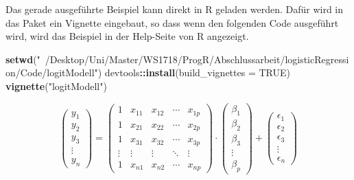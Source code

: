 \documentclass[12pt,]{article}
\newenvironment{Shaded}{\begin{snugshade}}{\end{snugshade}}
\newcommand{\KeywordTok}[1]{\textcolor[rgb]{0.13,0.29,0.53}{\textbf{#1}}}
\newcommand{\DataTypeTok}[1]{\textcolor[rgb]{0.13,0.29,0.53}{#1}}
\newcommand{\StringTok}[1]{\textcolor[rgb]{0.31,0.60,0.02}{#1}}
\newcommand{\OtherTok}[1]{\textcolor[rgb]{0.56,0.35,0.01}{#1}}
\newcommand{\OperatorTok}[1]{\textcolor[rgb]{0.81,0.36,0.00}{\textbf{#1}}}
\newcommand{\NormalTok}[1]{#1}
\begin{document}
Das gerade ausgeführte Beispiel kann direkt in R geladen werden. Dafür
wird in das Paket ein Vignette eingebaut, so dass wenn den folgenden
Code ausgeführt wird, wird das Beispiel in der Help-Seite von R
angezeigt.

\begin{Shaded}
\begin{Highlighting}[]
\KeywordTok{setwd}\NormalTok{(}\StringTok{"~/Desktop/Uni/Master/WS1718/ProgR/Abschlussarbeit/logisticRegression/Code/logitModell"}\NormalTok{)}
\NormalTok{devtools}\OperatorTok{::}\KeywordTok{install}\NormalTok{(}\DataTypeTok{build_vignettes =} \OtherTok{TRUE}\NormalTok{)}
\KeywordTok{vignette}\NormalTok{(}\StringTok{"logitModell"}\NormalTok{)}
\end{Highlighting}
\end{Shaded}

\[
\begin{pmatrix}
    y_1 \\ y_2 \\ y_3 \\ \vdots \\ y_n 
 \end{pmatrix} = 
 \begin{pmatrix}
    1 & x_{11} & x_{12} & \cdots & x_{1p} \\
    1 & x_{21} & x_{22} & \cdots & x_{2p} \\
    1 & x_{31} & x_{32} & \cdots & x_{3p} \\
    \vdots  & \vdots  & \vdots & \ddots & \vdots \\
    1 & x_{n1} & x_{n2} & \cdots & x_{np}
 \end{pmatrix} \cdot
 \begin{pmatrix}
    \beta_1 \\ \beta_2 \\ \beta_3 \\ \vdots \\ \beta_p  
 \end{pmatrix} +
 \begin{pmatrix}
    \epsilon_1 \\ \epsilon_2 \\ \epsilon_3 \\ \vdots \\ \epsilon_n  
 \end{pmatrix}
\]
\end{document}

